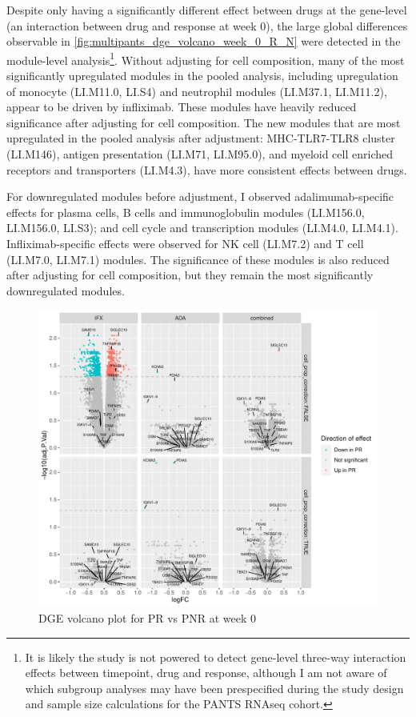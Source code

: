 \begin{outline}
Despite only  having a significantly different effect between drugs at the gene-level (an interaction between drug and response at week 0), 
the large global differences observable in \autoref{fig:multipants_dge_volcano_week_0_R_N} were detected in the module-level analysis\footnote{It is likely the study is not powered to detect gene-level three-way interaction effects between timepoint, drug and response, although I am not aware of which subgroup analyses may have been prespecified during the study design and sample size calculations for the \gls{PANTS} \gls{RNAseq} cohort.}.
Without adjusting for cell composition, many of the most significantly upregulated modules in the pooled analysis, 
including upregulation of monocyte (LI.M11.0, LI.S4) and neutrophil modules (LI.M37.1, LI.M11.2),
appear to be driven by infliximab.
These modules have heavily reduced significance after adjusting for cell composition.
The new modules that are most upregulated in the pooled analysis after adjustment:
MHC-TLR7-TLR8 cluster (LI.M146), antigen presentation (LI.M71, LI.M95.0), and myeloid cell enriched receptors and transporters (LI.M4.3),
have more consistent effects between drugs.

For downregulated modules before adjustment, I observed
adalimumab-specific effects for
plasma cells, B cells and immunoglobulin modules (LI.M156.0, LI.M156.0, LI.S3); and cell cycle and transcription modules (LI.M4.0, LI.M4.1).
Infliximab-specific effects were observed for NK cell (LI.M7.2) and T cell (LI.M7.0, LI.M7.1) modules.
The significance of these modules is also reduced after adjusting for cell composition,
but they remain the most significantly downregulated modules.

\begin{figure}
    \centering
    \includegraphics[width=1.0\textwidth,page=1]{mainmatter/figures/chapter_04/plot_gene_set_enrichment.dge_result_volcano_simple_C_1RI_1NI,C_1RA_1NA,C_1R_1N.pdf}
    \caption{DGE volcano plot for PR vs PNR at week 0}
    \label{fig:multipants_dge_volcano_week_0_R_N}
\end{figure}


\end{outline}
